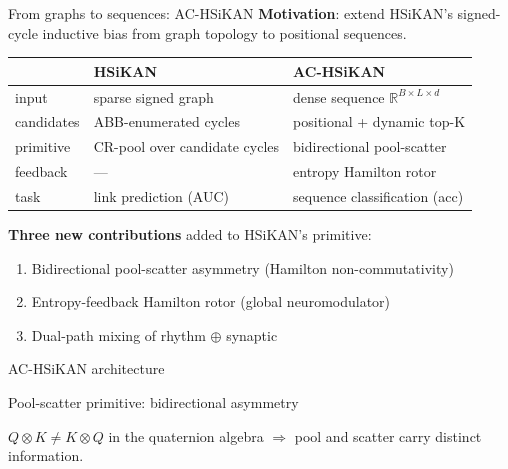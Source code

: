 \documentclass[aspectratio=169, 11pt]{beamer}
\begin{document}
\begin{frame}{From graphs to sequences: AC-HSiKAN}
  \textbf{Motivation}: extend HSiKAN's signed-cycle inductive bias from
  graph topology to positional sequences.

  \vspace{3mm}
  \begin{tabular}{lll}
  \toprule
                  & \textbf{HSiKAN}                & \textbf{AC-HSiKAN} \\
  \midrule
  input           & sparse signed graph             & dense sequence $\mathbb{R}^{B \times L \times d}$\\
  candidates      & ABB-enumerated cycles           & positional + dynamic top-K\\
  primitive       & CR-pool over candidate cycles   & bidirectional pool-scatter\\
  feedback        & ---                             & entropy Hamilton rotor\\
  task            & link prediction (AUC)           & sequence classification (acc)\\
  \bottomrule
  \end{tabular}

  \vspace{4mm}
  \textbf{Three new contributions} added to HSiKAN's primitive:
  \begin{enumerate}
  \item Bidirectional pool-scatter asymmetry (Hamilton non-commutativity)
  \item Entropy-feedback Hamilton rotor (global neuromodulator)
  \item Dual-path mixing of rhythm $\oplus$ synaptic
  \end{enumerate}
\end{frame}

\begin{frame}{AC-HSiKAN architecture}
  \centering
  \resizebox{0.92\textwidth}{!}{}
\end{frame}

\begin{frame}{Pool-scatter primitive: bidirectional asymmetry}
  \centering
  \resizebox{0.93\textwidth}{!}{}

  \vspace{2mm}
  \footnotesize
  $Q \otimes K \ne K \otimes Q$ in the quaternion algebra $\Rightarrow$
  pool and scatter carry distinct information.
\end{frame}
\end{document}

